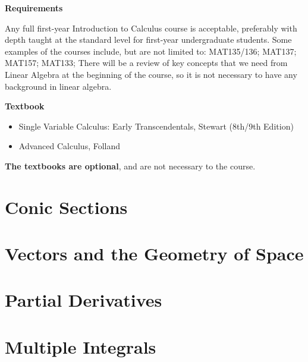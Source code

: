 \documentclass[11pt,fleqn]{book} %
\begin{document}
\textbf{Requirements}

Any full first-year Introduction to Calculus course is acceptable, preferably with depth taught at the standard level for first-year undergraduate students. Some examples of the courses include, but are not limited to: MAT135/136; MAT137; MAT157; MAT133; There will be a review of key concepts that we need from Linear Algebra at the beginning of the course, so it is not necessary to have any background in linear algebra.

\textbf{Textbook}

\begin{itemize}
    \item Single Variable Calculus: Early Transcendentals, Stewart (8th/9th Edition) \cite{Stewart}
    \item Advanced Calculus, Folland
\end{itemize}

\textbf{The textbooks are optional}, and are not necessary to the course. 


\chapter{Conic Sections}




\chapter{Vectors and the Geometry of Space}




\chapter{Partial Derivatives}




\chapter{Multiple Integrals}



\end{document}
